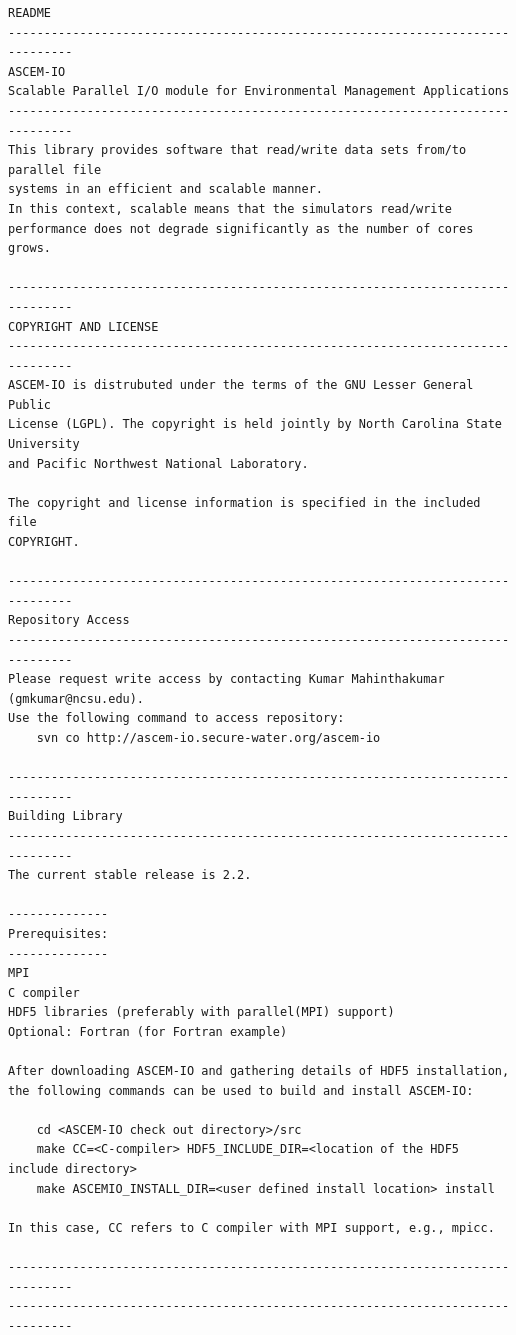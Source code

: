 \documentclass[12pt]{article}
\begin{document}
\scriptsize
\begin{verbatim}
README
-------------------------------------------------------------------------------
ASCEM-IO
Scalable Parallel I/O module for Environmental Management Applications
-------------------------------------------------------------------------------
This library provides software that read/write data sets from/to parallel file 
systems in an efficient and scalable manner. 
In this context, scalable means that the simulators read/write 
performance does not degrade significantly as the number of cores grows.

-------------------------------------------------------------------------------
COPYRIGHT AND LICENSE 
-------------------------------------------------------------------------------
ASCEM-IO is distrubuted under the terms of the GNU Lesser General Public 
License (LGPL). The copyright is held jointly by North Carolina State University 
and Pacific Northwest National Laboratory. 

The copyright and license information is specified in the included file 
COPYRIGHT. 

-------------------------------------------------------------------------------
Repository Access
-------------------------------------------------------------------------------
Please request write access by contacting Kumar Mahinthakumar (gmkumar@ncsu.edu). 
Use the following command to access repository:
	svn co http://ascem-io.secure-water.org/ascem-io

-------------------------------------------------------------------------------
Building Library
-------------------------------------------------------------------------------
The current stable release is 2.2.

--------------
Prerequisites:
--------------
MPI
C compiler
HDF5 libraries (preferably with parallel(MPI) support)
Optional: Fortran (for Fortran example)

After downloading ASCEM-IO and gathering details of HDF5 installation, 
the following commands can be used to build and install ASCEM-IO: 

	cd <ASCEM-IO check out directory>/src
	make CC=<C-compiler> HDF5_INCLUDE_DIR=<location of the HDF5 include directory>
	make ASCEMIO_INSTALL_DIR=<user defined install location> install

In this case, CC refers to C compiler with MPI support, e.g., mpicc.

-------------------------------------------------------------------------------
-------------------------------------------------------------------------------
\end{verbatim}
\end{document}
